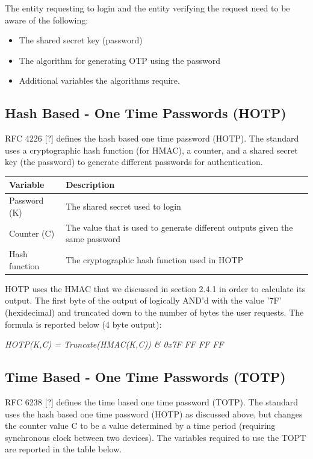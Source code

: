 \documentclass[bsc,frontabs,twoside,singlespacing,parskip,deptreport]{infthesis}     %
\begin{document}
The entity requesting to login and the entity verifying the request need to be aware of the following:
\begin{itemize}
\item The shared secret key (password)
\item The algorithm for generating OTP using the password
\item Additional variables the algorithms require.
\end{itemize}

\subsection{Hash Based - One Time Passwords (HOTP)}
RFC 4226 [?] defines the hash based one time password (HOTP). The standard uses a cryptographic hash function (for HMAC), a counter, and a shared secret key (the password) to generate different passwords for authentication.

\begin{table}[H]
\begin{tabular}{|l|p{10cm}|}
\hline
Variable & Description\\
\hline
Password (K) & The shared secret used to login\\
\hline
Counter (C) & The value that is used to generate different outputs given the same password\\
\hline
Hash function & The cryptographic hash function used in HOTP\\
\hline
\end{tabular}
\end{table}

HOTP uses the HMAC that we discussed in section 2.4.1 in order to calculate its output. The first byte of the output of logically AND'd with the value '7F' (hexidecimal) and truncated down to the number of bytes the user requests. The formula is reported below (4 byte output):
\begin{center}
\textit{HOTP(K,C) = Truncate(HMAC(K,C)) \& 0x7F FF FF FF}
\end{center}

\subsection{Time Based - One Time Passwords (TOTP)}
RFC 6238 [?] defines the time based one time password (TOTP). The standard uses the hash based one time password (HOTP) as discussed above, but changes the counter value C to be a value determined by a time period (requiring synchronous clock between two devices). The variables required to use the TOPT are reported in the table below.
\end{document}
